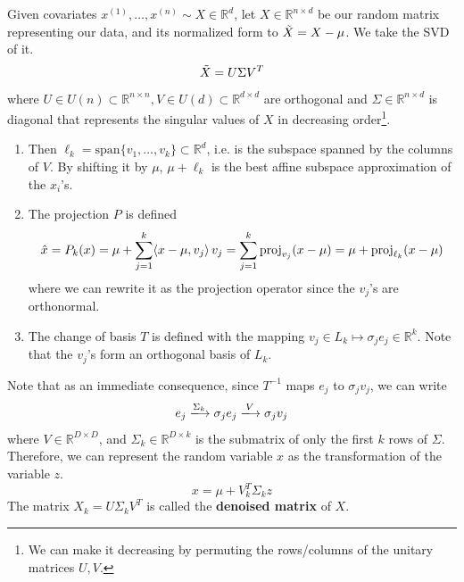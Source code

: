     \begin{theorem} 
      Given covariates $x^{(1)}, \ldots, x^{(n)} \sim X \in \mathbb{R}^{d}$, let $X \in \mathbb{R}^{n \times d}$ be our random matrix representing our data, and its normalized form to $\Tilde{X} = X - \mu$. We take the SVD of it. 
      \begin{equation}
        \Tilde{X} = U \Sigma V^T
      \end{equation}
      where $U \in U(n) \subset \mathbb{R}^{n \times n}, V \in U(d) \subset \mathbb{R}^{d \times d}$ are orthogonal and $\Sigma \in \mathbb{R}^{n \times d}$ is diagonal that represents the singular values of $X$ in decreasing order\footnote{We can make it decreasing by permuting the rows/columns of the unitary matrices $U, V$.}. 
      \begin{enumerate}
        \item Then $\ell_k = \mathrm{span}\{v_1, \ldots, v_k\} \subset \mathbb{R}^d$, i.e. is the subspace spanned by the columns of $V$. By shifting it by $\mu$, $\mu + \ell_k$ is the best affine subspace approximation of the $x_i$'s. 

        \item The projection $P$ is defined 
        \begin{equation}
          \hat{x} = P_k (x) = \mu + \sum_{j=1}^k \langle x - \mu, v_j \rangle \, v_j = \sum_{j=1}^k \operatorname{proj}_{v_j} (x - \mu) = \mu + \operatorname{proj}_{\ell_k} (x - \mu)
        \end{equation}
        where we can rewrite it as the projection operator since the $v_j$'s are orthonormal. 

        \item The change of basis $T$ is defined with the mapping $v_j \in L_k \mapsto \sigma_j e_j \in \mathbb{R}^k$. Note that the $v_j$'s form an orthogonal basis of $L_k$. 
      \end{enumerate} 
      Note that as an immediate consequence, since $T^{-1}$ maps $e_j$ to $\sigma_j v_j$, we can write 
      \begin{equation}
        e_j \xlongrightarrow{\Sigma_k} \sigma_j e_j \xlongrightarrow{V} \sigma_j v_j
      \end{equation}
      where $V \in \mathbb{R}^{D \times D}$, and $\Sigma_k \in \mathbb{R}^{D \times k}$ is the submatrix of only the first $k$ rows of $\Sigma$. Therefore, we can represent the random variable $x$ as the transformation of the variable $z$. 
      \begin{equation}
        x = \mu + V_k^T \Sigma_k z
      \end{equation}
      The matrix $X_k = U \Sigma_k V^T$ is called the \textbf{denoised matrix} of $X$. 
    \end{theorem}
